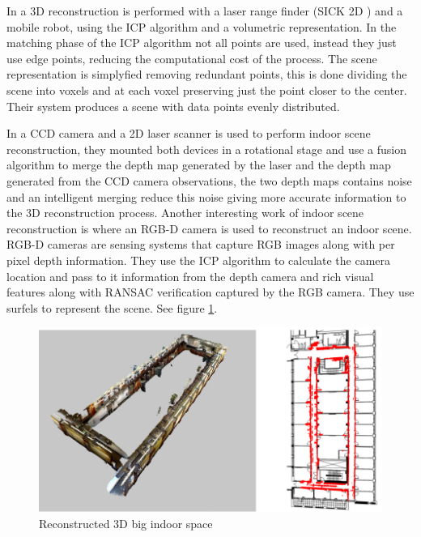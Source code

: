 In \cite{keqiang} a 3D reconstruction is performed with a laser range finder (SICK 2D ) and a mobile robot, 
using the ICP algorithm and a volumetric representation. In the matching phase of the ICP algorithm not all
 points are used, instead they just use edge points, reducing the computational cost of the process. The scene 
 representation is simplyfied removing redundant points, this is done dividing the scene into voxels and at each 
 voxel preserving just the point closer to the center. Their system produces a scene with data points evenly 
 distributed.


In \cite{wei} a CCD camera and a 2D laser scanner is used to perform indoor scene reconstruction, 
they mounted both devices in a rotational stage and use a fusion algorithm to merge the depth map generated by the laser 
and the depth map generated from the CCD camera observations, the two depth maps contains noise and an intelligent merging reduce this
 noise giving more accurate information to the 3D reconstruction process. Another interesting work of indoor scene reconstruction is \cite{henry} where an RGB-D camera is used to reconstruct an indoor scene. RGB-D cameras are sensing systems that capture RGB images
 along with per pixel depth information. They use the ICP algorithm to calculate the camera location and pass to it information from 
the depth camera and  rich visual
 features along with RANSAC verification captured by the RGB camera. They use surfels \cite{pfister} to represent the scene. See figure \ref{fig:henry}.

\begin{figure}[h!]
\begin{center}
\includegraphics[scale=0.29]{images/henry}
\caption{Reconstructed 3D big indoor space}
\label{fig:henry}
\end{center}
\end{figure}

